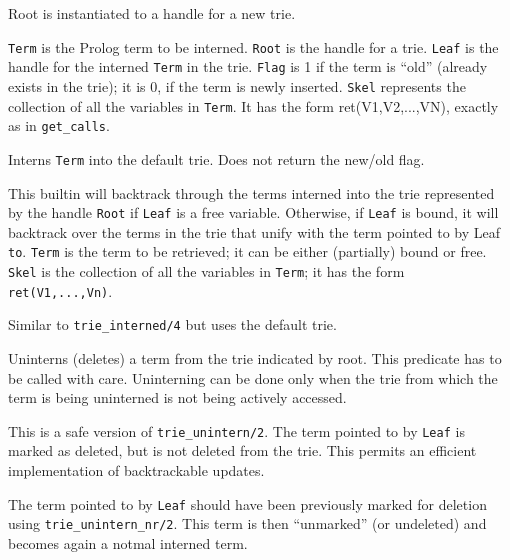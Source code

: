 \begin{description}
 
        Root is instantiated to a handle for a new trie.

{\tt Term} is the Prolog term to be interned. {\tt Root} is the handle for
a trie. {\tt Leaf} is the handle for the interned {\tt Term} in the trie.
{\tt Flag} is 1 if the term is ``old'' (already exists in the trie); it is
0, if the term is newly inserted.  {\tt Skel} represents the collection of
all the variables in {\tt Term}. It has the form ret(V1,V2,...,VN), exactly
as in {\tt get\_calls}.


Interns {\tt Term} into the default trie. Does not return the new/old flag.


This builtin will backtrack through the terms interned into the trie
represented by the handle {\tt Root} if {\tt Leaf} is a free variable.
Otherwise, if {\tt Leaf} is bound, it will backtrack over the terms in the
trie that unify with the term pointed to by Leaf {\tt to}.  {\tt Term} is
the term to be retrieved; it can be either (partially) bound or free.  {\tt
  Skel} is the collection of all the variables in {\tt Term}; it has the
form {\tt ret(V1,...,Vn)}.

 
Similar to {\tt trie\_interned/4}  but uses the default trie.


 
Uninterns (deletes) a term from the trie indicated by root.  This predicate
has to be called with care. Uninterning can be done only when the trie from
which the term is being uninterned is not being actively accessed.

This is a safe version of {\tt trie\_unintern/2}. The term pointed to by
{\tt Leaf} is marked as deleted, but is not deleted from the trie. This
permits an efficient implementation of backtrackable updates.

The term pointed to by {\tt Leaf} should have been previously marked for
deletion using
{\tt trie\_unintern\_nr/2}. This term is then ``unmarked'' (or undeleted)
and becomes again a notmal interned term.


\end{description}
